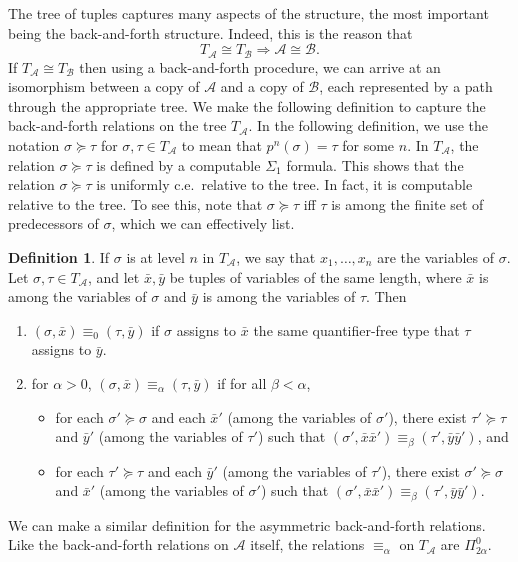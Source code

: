 \documentclass[10pt,a4paper]{article}
\theoremstyle{definition}
\newtheorem{defn}[thm]{Definition}
\begin{document}
	The tree of tuples captures many aspects of the structure, the most important being the back-and-forth structure. Indeed, this is the reason that
	\[ T_{\mathcal{A}} \cong T_{\mathcal{B}} \Longrightarrow \mathcal{A} \cong \mathcal{B}.\]
	If $T_{\mathcal{A}} \cong T_{\mathcal{B}}$ then using a back-and-forth procedure, we can arrive at an isomorphism between a copy of $\mathcal{A}$ and a copy of $\mathcal{B}$, each represented by a path through the appropriate tree. We make the following definition to capture the back-and-forth relations on the tree $T_{\mathcal{A}}$. 
	In the following definition, we use the notation $\sigma\succeq\tau$ for $\sigma,\tau \in T_{\mathcal{A}}$ to mean that $p^n(\sigma)=\tau$ for some $n$.
	In $T_{\mathcal{A}}$, the relation $\sigma\succeq\tau$ is defined by a computable $\Sigma_1$ formula. This shows that the relation $\sigma\succeq\tau$ is uniformly c.e.\ relative to the tree. In fact, it is computable relative to the tree. To see this, note that $\sigma\succeq\tau$ iff $\tau$ is among the finite set of predecessors of $\sigma$, which we can effectively list. 
		
	\begin{defn}
		 If $\sigma$ is at level $n$ in $T_\mathcal{A}$, we say that $x_1,\ldots,x_n$ are the variables of $\sigma$.  Let $\sigma,\tau \in T_{\mathcal{A}}$, and let $\bar{x},\bar{y}$ be tuples of variables of the same length, where $\bar{x}$ is among the variables of $\sigma$ and $\bar{y}$ is among the variables of $\tau$.  Then 
		
				\begin{enumerate}
			\item $(\sigma,\bar{x}) \equiv_0 (\tau,\bar{y})$ if $\sigma$ assigns to $\bar{x}$ the same quantifier-free type that $\tau$ assigns to $\bar{y}$.
			\item for $\alpha > 0$, $(\sigma,\bar{x}) \equiv_\alpha (\tau,\bar{y})$ if for all $\beta < \alpha$,
			\begin{itemize}
				\item for each $\sigma' \succeq \sigma$ and each $\bar{x}'$  (among the variables of $\sigma'$), there exist $\tau' \succeq \tau$ and $\bar{y}'$ (among the variables of $\tau'$) such that $(\sigma',\bar{x}\bar{x}') \equiv_\beta (\tau',\bar{y}\bar{y}')$, and
				\item for each $\tau' \succeq \tau$ and each $\bar{y}'$ (among the variables of $\tau'$), there exist $\sigma' \succeq \sigma$ and $\bar{x}'$ (among the variables of $\sigma'$) such that $(\sigma',\bar{x}\bar{x}') \equiv_\beta (\tau',\bar{y}\bar{y}')$.
			\end{itemize}
		\end{enumerate}
		We can make a similar definition for the asymmetric back-and-forth relations. Like the back-and-forth relations on $\mathcal{A}$ itself, the relations $\equiv_\alpha$ on $T_\mathcal{A}$ are $\Pi^0_{2\alpha}$.
	\end{defn}
	
\end{document}
